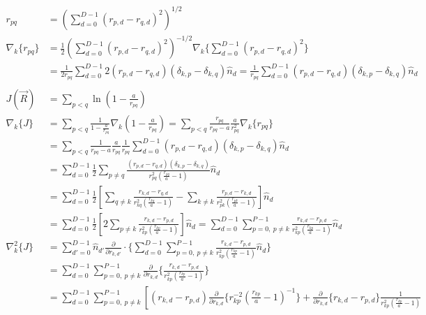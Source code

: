 \documentclass[12pt]{article}
\begin{document}
\begin{align*}
r_{pq} &= \left( \sum_{d=0}^{D-1} (r_{p,d}-r_{q,d})^2 \right)^{1/2}\\
\nabla_k \{ r_{pq} \} &= \frac{1}{2} \left( \sum_{d=0}^{D-1} (r_{p,d}-r_{q,d})^2 \right)^{-1/2} \nabla_k \bigg\{ \sum_{d=0}^{D-1} (r_{p,d}-r_{q,d})^2 \bigg\} \\
&= \frac{1}{2 r_{pq}} \sum_{d=0}^{D-1} 2(r_{p,d}-r_{q,d})(\delta_{k,p}-\delta_{k,q}) \hat{n}_{d} = \frac{1}{r_{pq}} \sum_{d=0}^{D-1} (r_{p,d}-r_{q,d}) (\delta_{k,p}-\delta_{k,q}) \hat{n}_{d} \\ \\
J(\vec{R}) &= \sum_{p<q} \ln \left( 1-\frac{a}{r_{pq}} \right)\\
\nabla_k \{ J \} &= \sum_{p<q} \frac{1}{1-\frac{a}{r_{pq}}} \nabla_{k} \left( 1-\frac{a}{r_{pq}} \right) 
= \sum_{p<q} \frac{r_{pq}}{r_{pq}-a} \frac{a}{r_{pq}^2} \nabla_k \{ r_{pq} \}\\
&= \sum_{p<q} \frac{1}{r_{pq}-a} \frac{a}{r_{pq}} \frac{1}{r_{pq}} \sum_{d=0}^{D-1} (r_{p,d}-r_{q,d})(\delta_{k,p}-\delta_{k,q}) \hat{n}_{d}\\
&= \sum_{d=0}^{D-1} \frac{1}{2} \sum_{p\neq q} \frac{(r_{p,d}-r_{q,d})(\delta_{k,p}-\delta_{k,q})}{r_{pq}^2(\frac{r_{pq}}{a}-1)} \hat{n}_d\\
&= \sum_{d=0}^{D-1} \frac{1}{2} \left[ \sum_{q \neq k} \frac{r_{k,d}-r_{q,d}}{r_{kq}^2 \left( \frac{r_{kq}}{a} -1 \right)} - \sum_{k \neq k} \frac{r_{p,d}-r_{k,d}}{r_{pk}^2 \left( \frac{r_{pk}}{a} -1 \right)} \right]\hat{n}_d\\
&= \sum_{d=0}^{D-1} \frac{1}{2} \left[2 \sum_{p \neq k} \frac{r_{k,d}-r_{p,d}}{r_{kp}^2 \left( \frac{r_{kp}}{a} -1 \right)} \right]\hat{n}_d = \sum_{d=0}^{D-1} \sum_{p=0, \ p\neq k}^{P-1} \frac{r_{k,d}-r_{p,d}}{r_{kp}^2 \left( \frac{r_{kp}}{a} -1 \right)} \hat{n}_d\\ 
\nabla_k^2 \{ J \} &= \sum_{d'=0}^{D-1} \hat{n}_{d'} \frac{\partial}{\partial r_{k,d'}} \cdot \bigg\{ \sum_{d=0}^{D-1} \sum_{p=0, \ p\neq k}^{P-1} \frac{r_{k,d}-r_{p,d}}{r_{kp}^2 \left( \frac{r_{kp}}{a} -1 \right)} \hat{n}_d  \bigg\} \\
&= \sum_{d=0}^{D-1} \sum_{p=0, \ p\neq k}^{P-1} \frac{\partial}{\partial r_{k,d}} \bigg\{ \frac{r_{k,d}-r_{p,d}}{r_{kp}^2 \left( \frac{r_{kp}}{a} -1 \right)} \bigg\} \\
&= \sum_{d=0}^{D-1} \sum_{p=0, \ p\neq k}^{P-1} 
\left[ (r_{k,d}-r_{p,d})
\frac{\partial}{\partial r_{k,d}} \bigg\{ r_{kp}^{-2}\left( \frac{r_{kp}}{a} -1 \right)^{-1} \bigg\} + \frac{\partial}{\partial r_{k,d}} \Big\{ r_{k,d}-r_{p,d}  \Big\} \frac{1}{r_{kp}^2 \left( \frac{r_{kp}}{a} -1 \right)}

\end{align*}
\end{document}
